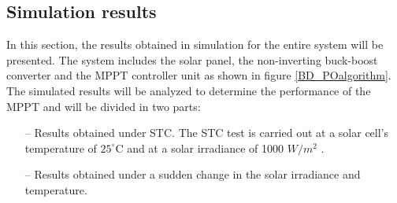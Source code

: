 \subsection{Simulation results}

In this section, the results obtained in simulation for the entire system will be presented. The system includes the solar panel, the non-inverting buck-boost converter and the MPPT controller unit as shown in figure \ref{BD_POalgorithm}. The simulated results will be analyzed to determine the performance of the MPPT and will be divided in two parts: 
\begin{itemize}
	\item[--] Results obtained under STC. The STC test is carried out at a solar cell's temperature of $25^\circ$C and at a solar irradiance of 1000 $W/ m^2$ \cite{handbook}.
	\item[--] Results obtained under a sudden change in the solar irradiance and temperature.
\end{itemize}

